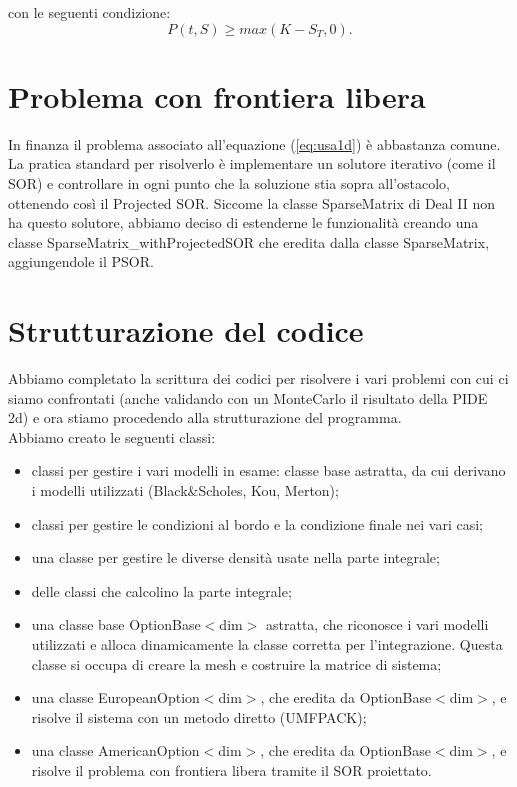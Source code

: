 \documentclass[a4paper,10pt]{article}
\begin{document}
con le seguenti condizione: $$P(t,S)\geq max(K-S_T, 0).$$

\section{Problema con frontiera libera}
In finanza il problema associato all'equazione (\ref{eq:usa1d}) \`e abbastanza comune. La pratica standard per risolverlo \`e implementare un solutore iterativo (come il SOR) e controllare in ogni punto che la soluzione stia sopra all'ostacolo, ottenendo cos\`i il Projected SOR. Siccome la classe \textsf{SparseMatrix} di Deal II non ha questo solutore, abbiamo deciso di estenderne le funzionalit\`a creando una classe \textsf{SparseMatrix\_withProjectedSOR} che eredita dalla classe \textsf{SparseMatrix}, aggiungendole il PSOR.

\section{Strutturazione del codice}

Abbiamo completato la scrittura dei codici per risolvere i vari problemi con cui ci siamo confrontati (anche validando con un MonteCarlo il risultato della PIDE 2d) e ora stiamo procedendo alla strutturazione del programma.\\Abbiamo creato le seguenti classi:
\begin{itemize}
\item{classi per gestire i vari modelli in esame: classe base astratta, da cui derivano i modelli utilizzati (Black\&Scholes, Kou, Merton);}
\item{classi per gestire le condizioni al bordo e la condizione finale nei vari casi;}
\item{una classe per gestire le diverse densit\`a usate nella parte integrale;}
\item{delle classi che calcolino la parte integrale;}
\item{una classe base \textsf{OptionBase$<$dim$>$} astratta, che riconosce i vari modelli utilizzati e alloca dinamicamente la classe corretta per l'integrazione. Questa classe si occupa di creare la mesh e costruire la matrice di sistema;}
\item{una classe \textsf{EuropeanOption$<$dim$>$}, che eredita da \textsf{OptionBase$<$dim$>$}, e risolve il sistema con un metodo diretto (UMFPACK);}
\item{una classe \textsf{AmericanOption$<$dim$>$}, che eredita da \textsf{OptionBase$<$dim$>$}, e risolve il problema con frontiera libera tramite il SOR proiettato.}
\end{itemize}
\end{document}
